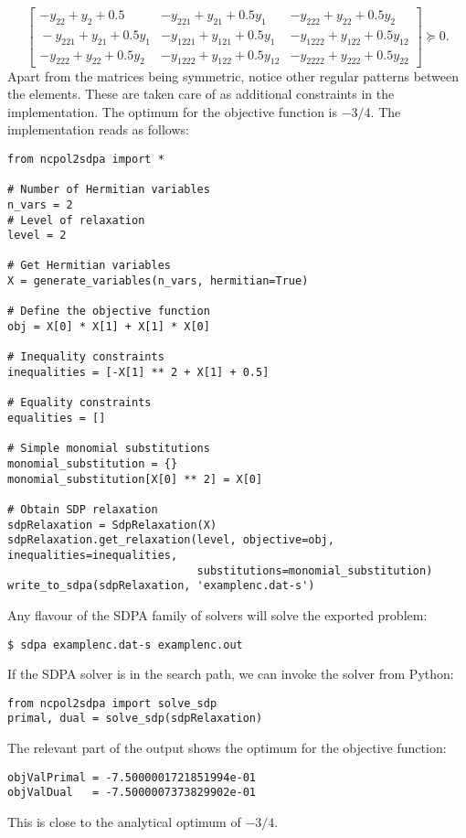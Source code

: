 \documentclass{article}
\begin{document}
\[
\left[ \begin{array}{c|cc}
-y_{22}+y_{2}+0.5 & -y_{221}+y_{21}+0.5y_{1} & -y_{222}+y_{22}+0.5y_{2}\\
\hline{}
-y_{221}+y_{21}+0.5y_{1} & -y_{1221}+y_{121}+0.5y_{1} & -y_{1222}+y_{122}+0.5y_{12}\\
-y_{222}+y_{22}+0.5y_{2} & -y_{1222}+y_{122}+0.5y_{12} & -y_{2222}+y_{222}+0.5y_{22}
\end{array}\right]\succeq{}0.
\]
Apart from the matrices being symmetric, notice other regular patterns between the elements. These are taken care of as additional constraints in the implementation. The optimum for the objective function is $-3/4$. The implementation reads as follows:
\begin{verbatim}
from ncpol2sdpa import *

# Number of Hermitian variables
n_vars = 2
# Level of relaxation
level = 2

# Get Hermitian variables
X = generate_variables(n_vars, hermitian=True)

# Define the objective function
obj = X[0] * X[1] + X[1] * X[0]

# Inequality constraints
inequalities = [-X[1] ** 2 + X[1] + 0.5]

# Equality constraints
equalities = []

# Simple monomial substitutions
monomial_substitution = {}
monomial_substitution[X[0] ** 2] = X[0]

# Obtain SDP relaxation
sdpRelaxation = SdpRelaxation(X)
sdpRelaxation.get_relaxation(level, objective=obj, inequalities=inequalities,
                             substitutions=monomial_substitution)
write_to_sdpa(sdpRelaxation, 'examplenc.dat-s')
\end{verbatim}

Any flavour of the SDPA family of solvers will solve the exported problem:
\begin{verbatim}
$ sdpa examplenc.dat-s examplenc.out
\end{verbatim}

If the SDPA solver is in the search path, we can invoke the solver from Python:
\begin{verbatim}
from ncpol2sdpa import solve_sdp
primal, dual = solve_sdp(sdpRelaxation)
\end{verbatim}

The relevant part of the output shows the optimum for the objective function:
\begin{verbatim}
objValPrimal = -7.5000001721851994e-01
objValDual   = -7.5000007373829902e-01
\end{verbatim}
This is close to the analytical optimum of $-3/4$.
\end{document}
